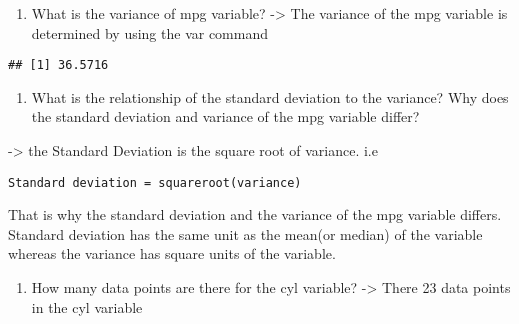 \documentclass[]{article}
\newenvironment{Shaded}{\begin{snugshade}}{\end{snugshade}}
\newcommand{\KeywordTok}[1]{\textcolor[rgb]{0.13,0.29,0.53}{\textbf{{#1}}}}
\newcommand{\NormalTok}[1]{{#1}}
\begin{document}
\begin{enumerate}
\def\labelenumi{\arabic{enumi}.}
\setcounter{enumi}{4}
\itemsep1pt\parskip0pt
\item
  What is the variance of mpg variable? -\textgreater{} The variance of
  the mpg variable is determined by using the var command
\end{enumerate}

\begin{Shaded}
\end{Shaded}

\begin{verbatim}
## [1] 36.5716
\end{verbatim}

\begin{enumerate}
\def\labelenumi{\arabic{enumi}.}
\setcounter{enumi}{5}
\itemsep1pt\parskip0pt
\item
  What is the relationship of the standard deviation to the variance?
  Why does the standard deviation and variance of the mpg variable
  differ?
\end{enumerate}

-\textgreater{} the Standard Deviation is the square root of variance.
i.e

\begin{verbatim}
Standard deviation = squareroot(variance)
\end{verbatim}

That is why the standard deviation and the variance of the mpg variable
differs. Standard deviation has the same unit as the mean(or median) of
the variable whereas the variance has square units of the variable.

\begin{enumerate}
\def\labelenumi{\arabic{enumi}.}
\setcounter{enumi}{6}
\itemsep1pt\parskip0pt
\item
  How many data points are there for the cyl variable? -\textgreater{}
  There 23 data points in the cyl variable
\end{enumerate}

\begin{Shaded}
\end{Shaded}
\end{document}
